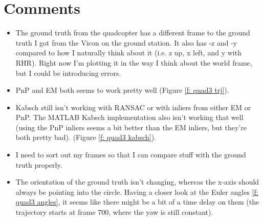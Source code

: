 \documentclass[12pt,a4paper]{article}
\begin{document}
\section{Comments}
\begin{itemize}
  \item The ground truth from the quadcopter has a different frame to the ground truth I got from the Vicon on the ground station. It also has -z and -y compared to how I naturally think about it (i.e. z up, x left, and y with RHR). Right now I'm plotting it in the way I think about the world frame, but I could be introducing errors.
  \item PnP and EM both seems to work pretty well (Figure \ref{f: quad3 trj}).
  \item Kabsch still isn't working with RANSAC or with inliers from either EM or PnP. The MATLAB Kabsch implementation also isn't working that well (using the PnP inliers seems a bit better than the EM inliers, but they're both pretty bad). (Figure \ref{f: quad3 kabsch}).
  \item I need to sort out my frames so that I can compare stuff with the ground truth properly.
  \item The orientation of the ground truth isn't changing, whereas the x-axis should always be pointing into the circle. Having a closer look at the Euler angles \ref{f: quad3 angles}, it seems like there might be a bit of a time delay on them (the trajectory starts at frame 700, where the yaw is still constant).
\end{itemize}

\end{document}
